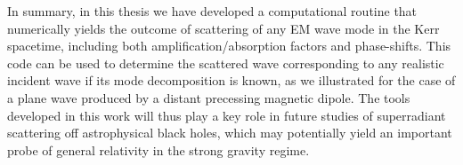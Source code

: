 In summary, in this thesis we have developed a computational routine that numerically yields the outcome of scattering of any EM wave mode in the Kerr spacetime, including both amplification/absorption factors and phase-shifts. 
This code can be used to determine the scattered wave corresponding to any realistic incident wave if its mode decomposition is known, as we illustrated for the case of a plane wave produced by a distant precessing magnetic dipole.
The tools developed in this work will thus play a key role in future studies of superradiant scattering off astrophysical black holes, which may potentially yield an important probe of general relativity in the strong gravity regime.